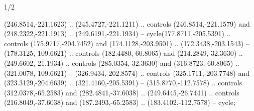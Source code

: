 \begin{flagdescription}{1/2}
\begin{scope}[xshift=0.373\flagwidth*\stretchfactor]
\begin{scope}[scale=0.207\flagwidth,xshift=-0.625mm,yshift=1.71mm]
\begin{scope}[y=0.80pt, x=0.80pt, yscale=-1, xscale=1, inner sep=0pt, outer sep=0pt]
  (246.8514,-221.1623) .. (245.4727,-221.1211) .. controls (246.8514,-221.1579)
  and (248.2322,-221.1913) .. (249.6191,-221.1934) -- cycle(177.8711,-205.5391)
  .. controls (175.9717,-204.7452) and (174.1128,-203.9501) ..
  (172.3438,-203.1543) -- (178.3125,-109.6621) .. controls (182.4480,-60.8065)
  and (214.2849,-32.3630) .. (249.6602,-21.1934) .. controls (285.0354,-32.3630)
  and (316.8723,-60.8065) .. (321.0078,-109.6621) -- (326.9434,-202.8574) ..
  controls (325.1711,-203.7748) and (323.3129,-204.6639) .. (321.4160,-205.5391)
  -- (315.8770,-112.7578) .. controls (312.0378,-65.2583) and
  (282.4841,-37.6038) .. (249.6445,-26.7441) .. controls (216.8049,-37.6038) and
  (187.2493,-65.2583) .. (183.4102,-112.7578) -- cycle;
\end{scope}
\end{scope}
\end{scope}
\fi
\framecode{}
\end{flagdescription}
